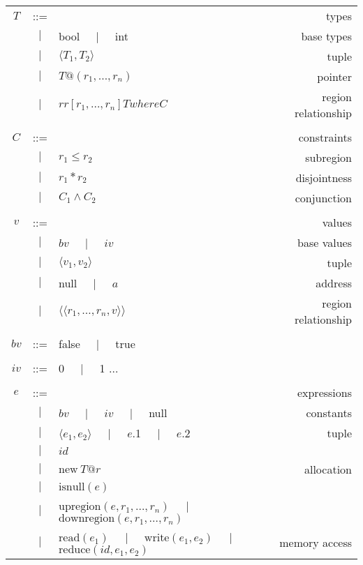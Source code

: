 \begin{table*}
\centering
{\small
\begin{tabular}{cclr}

$T$ & ::= &  & types \\
  &$\mid$& bool $\;\;\;\mid\;\;\;$ int & base types \\
  &$\mid$& $\langle T_1, T_2 \rangle$ & tuple \\
  &$\mid$& $T@(r_1, \ldots, r_n)$ & pointer \\
  &$\mid$& $rr[r_1, \ldots, r_n] T where C$ & region relationship \\
\\
$C$ & ::= &  & constraints \\
  &$\mid$& $r_1 \leq r_2$ & subregion \\
  &$\mid$& $r_1 * r_2$ & disjointness \\
  &$\mid$& $C_1 \wedge C_2$ & conjunction \\
\\
$v$ & ::= & & values \\
  &$\mid$& $bv$ $\;\;\;\mid\;\;\;$ $iv$ & base values \\
  &$\mid$& $\langle v_1, v_2 \rangle$ & tuple \\
  &$\mid$& null $\;\;\;\mid\;\;\;$ $a$ & address \\
  &$\mid$& $\langle \langle r_1, \ldots, r_n, v\rangle \rangle$ & region relationship \\
\\
$bv$ & ::= & false $\;\;\;\mid\;\;\;$ true \\
\\
$iv$ & ::= & 0 $\;\;\;\mid\;\;\;$ 1 $\ldots$ \\
\\
$e$ & ::= & & expressions \\
  &$\mid$& $bv$ $\;\;\;\mid\;\;\;$ $iv$ $\;\;\;\mid\;\;\;$ null & constants \\
  &$\mid$& $\langle e_1, e_2 \rangle$ $\;\;\;\mid\;\;\;$ $e$.1 $\;\;\;\mid\;\;\;$ $e$.2 & tuple \\
  &$\mid$& $id$ &  \\
  &$\mid$& $\text{new}\ T@r$ & allocation \\
  &$\mid$& $\text{isnull}(e)$ & \\
  &$\mid$& $\text{upregion}(e, r_1,\ldots,r_n)$ $\;\;\;\mid\;\;\;$ $\text{downregion}(e, r_1,\ldots,r_n)$ & \\
  &$\mid$& $\text{read}(e_1)$ $\;\;\;\mid\;\;\;$ $\text{write}(e_1, e_2)$ $\;\;\;\mid\;\;\;$ $\text{reduce}(id, e_1, e_2)$ & memory access \\

\end{tabular}}
\end{table*}
